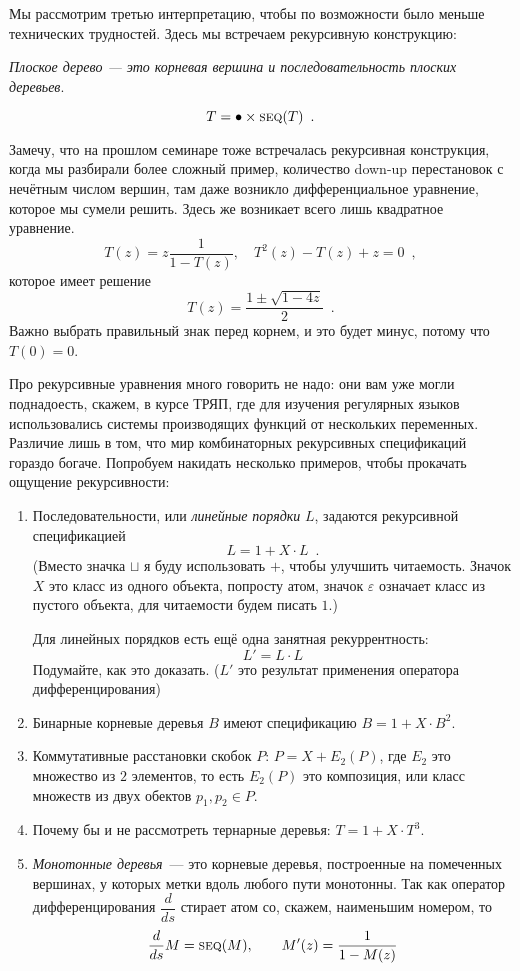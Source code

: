 \documentclass{article}
\theoremstyle{definition}
\begin{document}
Мы рассмотрим третью интерпретацию, чтобы по возможности было меньше 
технических трудностей. Здесь мы встречаем рекурсивную конструкцию:

\textit{Плоское дерево --- это корневая вершина и последовательность плоских 
деревьев}.

\[
	T = \bullet \times \text{\textsc{seq}}(T) \enspace .
\]

Замечу, что на прошлом семинаре тоже встречалась рекурсивная конструкция, когда 
мы разбирали более сложный пример, количество down-up перестановок с нечётным 
числом вершин, там даже возникло дифференциальное уравнение, которое мы сумели 
решить. Здесь же возникает всего лишь квадратное уравнение.
\[
	T(z) = z \dfrac{1}{1 - T(z)}, \quad T^2(z) - T(z) + z = 0 \enspace ,
\]
которое имеет решение
\[
	T(z) = \dfrac{1 \pm \sqrt{1 - 4z}}{2} \enspace .
\]
Важно выбрать правильный знак перед корнем, и это будет минус, потому что \( 
T(0) = 0 \).

Про рекурсивные уравнения много говорить не надо: они вам уже могли 
поднадоесть, скажем, в курсе ТРЯП, где для изучения регулярных языков 
использовались системы производящих функций от нескольких переменных. Различие 
лишь в том, что мир комбинаторных рекурсивных спецификаций гораздо богаче. 
Попробуем накидать несколько примеров, чтобы прокачать ощущение рекурсивности:
\begin{enumerate}
	\item Последовательности, или \textit{линейные порядки} \( L \), задаются 
	рекурсивной спецификацией
	\[
		L = 1 + X \cdot L \enspace .
	\]
	(Вместо значка \( \sqcup \) я буду использовать \( + \), чтобы улучшить 
	читаемость. Значок \( X \) это класс из одного объекта, попросту атом, 
	значок \( \varepsilon \) означает класс из пустого объекта, для читаемости 
	будем писать \( 1 \).)
	
	Для линейных порядков есть ещё одна занятная рекуррентность:
	\[
		L' = L \cdot L
	\]
	Подумайте, как это доказать. (\( L' \) это результат применения оператора 
	дифференцирования)
	\item Бинарные корневые деревья \( B \) имеют спецификацию \( B = 1 + X 
	\cdot B^2 \).
	\item Коммутативные расстановки скобок \( P \): \( P = X + E_2(P) \), где 
	\( E_2 \) это множество из \( 2 \) элементов, то есть \( E_2(P) \) это 
	композиция, или класс множеств из двух обектов \( p_1, p_2 \in P \).
	\item Почему бы и не рассмотреть тернарные деревья: \( T = 1 + X \cdot T^3 
	\).
	\item \textit{Монотонные деревья}~--- это корневые деревья, построенные на 
	помеченных вершинах, у которых метки вдоль любого пути монотонны. Так как 
	оператор дифференцирования \( \dfrac{d}{ds} \) стирает атом со, скажем, 
	наименьшим номером, то 
	\[
		\dfrac{d}{ds} M = \text{\textsc{seq}}(M), \qquad
		M'(z) = \dfrac{1}{1 - M(z)}
	\]
\end{enumerate}
\end{document}
